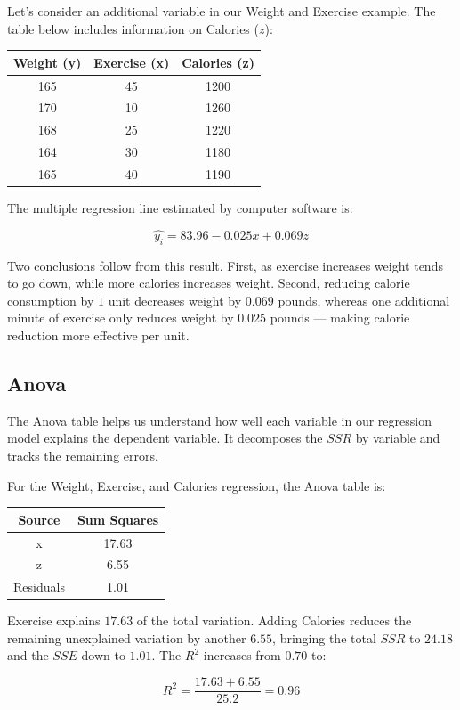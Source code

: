 \documentclass[
  11pt,
  letterpaper,
  DIV=11,
  numbers=noendperiod,
  oneside,
  open=any]{scrreprt}
\begin{document}
\begin{bsexample}[Example]

Let's consider an additional variable in our Weight and Exercise
example. The table below includes information on Calories (\(z\)):

\begin{center}
\begin{tabular}{ccc}
\toprule
Weight (y) & Exercise (x) & Calories (z) \\
\midrule
165 & 45 & 1200 \\
170 & 10 & 1260 \\
168 & 25 & 1220 \\
164 & 30 & 1180 \\
165 & 40 & 1190 \\
\bottomrule
\end{tabular}
\end{center}

The multiple regression line estimated by computer software is:

\[\hat{y_i}=83.96-0.025x+0.069z\]

Two conclusions follow from this result. First, as exercise increases
weight tends to go down, while more calories increases weight. Second,
reducing calorie consumption by \(1\) unit decreases weight by \(0.069\)
pounds, whereas one additional minute of exercise only reduces weight by
\(0.025\) pounds --- making calorie reduction more effective per unit.

\end{bsexample}

\subsection*{Anova}\label{anova}

The Anova table helps us understand how well each variable in our
regression model explains the dependent variable. It decomposes the
\(SSR\) by variable and tracks the remaining errors.

\begin{bsexample}[Example]

For the Weight, Exercise, and Calories regression, the Anova table is:

\begin{center}
\begin{tabular}{cc}
\toprule
Source & Sum Squares \\
\midrule
x & 17.63 \\
z & 6.55 \\
Residuals & 1.01 \\
\bottomrule
\end{tabular}
\end{center}

Exercise explains \(17.63\) of the total variation. Adding Calories
reduces the remaining unexplained variation by another \(6.55\),
bringing the total \(SSR\) to \(24.18\) and the \(SSE\) down to
\(1.01\). The \(R^2\) increases from \(0.70\) to:

\[R^2=\frac{17.63+6.55}{25.2}=0.96\]

\end{bsexample}
\end{document}
